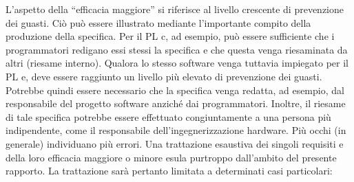 L'aspetto della “efficacia maggiore” si riferisce al livello crescente di prevenzione dei guasti. Ciò può essere illustrato mediante l'importante compito della produzione della specifica. Per il PL c, ad esempio, può essere sufficiente che i programmatori redigano essi stessi la specifica e che questa venga riesaminata da altri (riesame interno). Qualora lo stesso software venga tuttavia impiegato per il PL e, deve essere raggiunto un livello più elevato di prevenzione dei guasti. Potrebbe quindi essere necessario che la specifica venga redatta, ad esempio, dal responsabile del progetto software anziché dai programmatori. Inoltre, il riesame di tale specifica potrebbe essere effettuato congiuntamente a una persona più indipendente, come il responsabile dell'ingegnerizzazione hardware. Più occhi (in generale) individuano più errori. Una trattazione esaustiva dei singoli requisiti e della loro efficacia maggiore o minore esula purtroppo dall'ambito del presente rapporto. La trattazione sarà pertanto limitata a determinati casi particolari:
